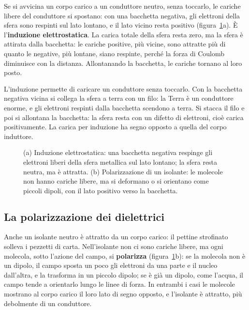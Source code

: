 Se si avvicina un corpo carico a un conduttore neutro, senza toccarlo, le cariche libere del conduttore si spostano: con una bacchetta negativa, gli elettroni della sfera sono respinti sul lato lontano, e il lato vicino resta positivo (figura~\ref{fig:ud6-induzione}a). È l'\textbf{induzione elettrostatica}. La carica totale della sfera resta zero, ma la sfera è attirata dalla bacchetta: le cariche positive, più vicine, sono attratte più di quanto le negative, più lontane, siano respinte, perché la forza di Coulomb diminuisce con la distanza. Allontanando la bacchetta, le cariche tornano al loro posto.

L'induzione permette di caricare un conduttore senza toccarlo. Con la bacchetta negativa vicina si collega la sfera a terra con un filo: la Terra è un conduttore enorme, e gli elettroni respinti dalla bacchetta scendono a terra. Si stacca il filo e poi si allontana la bacchetta: la sfera resta con un difetto di elettroni, cioè carica positivamente. La carica per induzione ha segno opposto a quella del corpo induttore.

\begin{figure}[h]
\centering

\caption{(a) Induzione elettrostatica: una bacchetta negativa respinge gli elettroni liberi della sfera metallica sul lato lontano; la sfera resta neutra, ma è attratta. (b) Polarizzazione di un isolante: le molecole non hanno cariche libere, ma si deformano o si orientano come piccoli dipoli, con il lato positivo verso la bacchetta.}
\label{fig:ud6-induzione}
\end{figure}



\subsection{La polarizzazione dei dielettrici}

Anche un isolante neutro è attratto da un corpo carico: il pettine strofinato solleva i pezzetti di carta. Nell'isolante non ci sono cariche libere, ma ogni molecola, sotto l'azione del campo, si \textbf{polarizza} (figura~\ref{fig:ud6-induzione}b): se la molecola non è un dipolo, il campo sposta un poco gli elettroni da una parte e il nucleo dall'altra, e la trasforma in un piccolo dipolo; se è già un dipolo, come l'acqua, il campo tende a orientarlo lungo le linee di forza. In entrambi i casi le molecole mostrano al corpo carico il loro lato di segno opposto, e l'isolante è attratto, più debolmente di un conduttore.

